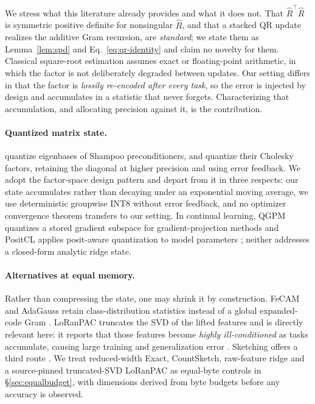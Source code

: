 \documentclass{article}
\begin{document}
We stress what this literature already provides and what it does not. That
$\widehat R^{\top}\widehat R$ is symmetric positive definite for nonsingular
$\widehat R$, and that a stacked QR update realizes the additive Gram
recursion, are \emph{standard}; we state them as Lemma~\ref{lem:spd} and
Eq.~\ref{eq:qr-identity} and claim no novelty for them. Classical square-root
estimation assumes exact or floating-point arithmetic, in which the factor is
not deliberately degraded between updates. Our setting differs in that the
factor is \emph{lossily re-encoded after every task}, so the error is injected
by design and accumulates in a statistic that never forgets. Characterizing
that accumulation, and allocating precision against it, is the contribution.

\paragraph{Quantized matrix state.}
\citet{wang2024fourbitshampoo} quantize eigenbases of Shampoo preconditioners,
and \citet{li2025fourbit} quantize their Cholesky factors, retaining the
diagonal at higher precision and using error feedback. We adopt the
factor-space design pattern and depart from it in three respects: our state
accumulates rather than decaying under an exponential moving average, we use
deterministic groupwise INT8 without error feedback, and no optimizer
convergence theorem transfers to our setting. In continual learning, QGPM
quantizes a stored gradient subspace for gradient-projection methods
\citep{kim2026qgpm} and PositCL applies posit-aware quantization to model
parameters \citep{positcl2024}; neither addresses a closed-form analytic ridge
state.

\paragraph{Alternatives at equal memory.}
Rather than compressing the state, one may shrink it by construction. FeCAM and
AdaGauss retain class-distribution statistics instead of a global expanded-code
Gram \citep{goswami2023fecam,rypesc2024adagauss}. LoRanPAC truncates the SVD of
the lifted features and is directly relevant here: it reports that those
features become \emph{highly ill-conditioned} as tasks accumulate, causing
large training and generalization error \citep{peng2025loranpac}. Sketching
offers a third route \citep{ghashami2016,streamingridge2020}. We treat
reduced-width Exact, CountSketch, raw-feature ridge and a source-pinned
truncated-SVD LoRanPAC as equal-byte controls in \S\ref{sec:equalbudget}, with
dimensions derived from byte budgets before any accuracy is observed.
\end{document}

